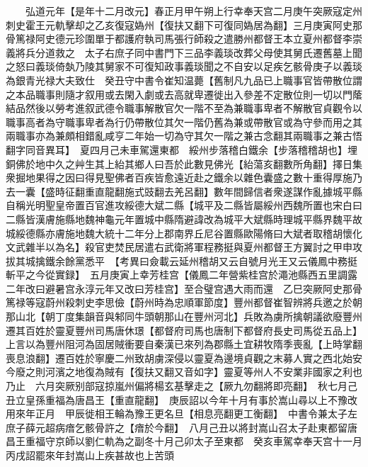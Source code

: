 　　弘道元年【是年十二月改元】春正月甲午朔上行幸奉天宫二月庚午突厥寇定州刺史霍王元軌擊却之乙亥復寇媯州【復扶又翻下可復同媯居為翻】三月庚寅阿史那骨篤禄阿史德元珍圍單于都護府執司馬張行師殺之遣勝州都督王本立夏州都督李崇義將兵分道救之　太子右庶子同中書門下三品李義琰改葬父母使其舅氏遷舊墓上聞之怒曰義琰倚埶乃陵其舅家不可復知政事義琰聞之不自安以足疾乞骸骨庚子以義琰為銀青光禄大夫致仕　癸丑守中書令崔知温薨【舊制凡九品已上職事官皆帶散位謂之本品職事則隨才叙用或去閑入劇或去高就卑遷徙出入參差不定散位則一切以門䕃結品然後以勞考進叙武德令職事解散官欠一階不至為兼職事卑者不解散官貞觀令以職事高者為守職事卑者為行仍帶散位其欠一階仍舊為兼或帶散官或為守參而用之其兩職事亦為兼頗相錯亂咸亨二年始一切為守其欠一階之兼古念翻其兩職事之兼古悟翻字同音異耳】　夏四月己未車駕還東都　綏州步落稽白鐵余【步落稽稽胡也】埋銅佛於地中久之艸生其上紿其鄉人曰吾於此數見佛光【紿蕩亥翻數所角翻】擇日集衆掘地果得之因曰得見聖佛者百疾皆愈遠近赴之鐵余以雜色囊盛之數十重得厚施乃去一囊【盛時征翻重直龍翻施式豉翻去羌呂翻】數年間歸信者衆遂謀作亂據城平縣自稱光明聖皇帝置百官進攻綏德大斌二縣【城平及二縣皆屬綏州西魏所置也宋白曰二縣皆漢膚施縣地魏神龜元年置城中縣隋避諱改為城平大斌縣時理城平縣界魏平故城綏德縣亦膚施地魏大統十二年分上郡南界丘尼谷置縣歐陽脩曰大斌者取稽胡懷化文武雜半以為名】殺官吏焚民居遣右武衛將軍程務挺與夏州都督王方翼討之甲申攻拔其城擒鐵余餘黨悉平　【考異曰僉載云延州稽胡又云自號月光王又云儀鳳中務挺斬平之今從實録】　五月庚寅上幸芳桂宫【儀鳳二年營紫桂宫於澠池縣西五里調露二年改曰避暑宫永淳元年又改曰芳桂宫】至合璧宫遇大雨而還　乙巳突厥阿史那骨篤禄等寇蔚州殺刺史李思儉【蔚州時為忠順軍節度】豐州都督崔智辨將兵邀之於朝那山北【朝丁度集韻音與邾同牛頭朝那山在豐州河北】兵敗為虜所擒朝議欲廢豐州遷其百姓於靈夏豐州司馬唐休璟【都督府司馬也唐制下都督府長史司馬從五品上】上言以為豐州阻河為固居賊衝要自秦漢已來列為郡縣土宜耕牧隋季喪亂【上時掌翻喪息浪翻】遷百姓於寧慶二州致胡虜深侵以靈夏為邊境貞觀之末募人實之西北始安今廢之則河濱之地復為賊有【復扶又翻又音如字】靈夏等州人不安業非國家之利也乃止　六月突厥别部寇掠嵐州偏將楊玄基擊走之【厥九勿翻將即亮翻】　秋七月己丑立皇孫重福為唐昌王【重直龍翻】　庚辰詔以今年十月有事於嵩山尋以上不豫改用來年正月　甲辰徙相王輪為豫王更名旦【相息亮翻更工衡翻】　中書令兼太子左庶子薛元超病瘖乞骸骨許之【瘖於今翻】　八月己丑以將封嵩山召太子赴東都留唐昌王重福守京師以劉仁軌為之副冬十月己卯太子至東都　癸亥車駕幸奉天宫十一月丙戌詔罷來年封嵩山上疾甚故也上苦頭

